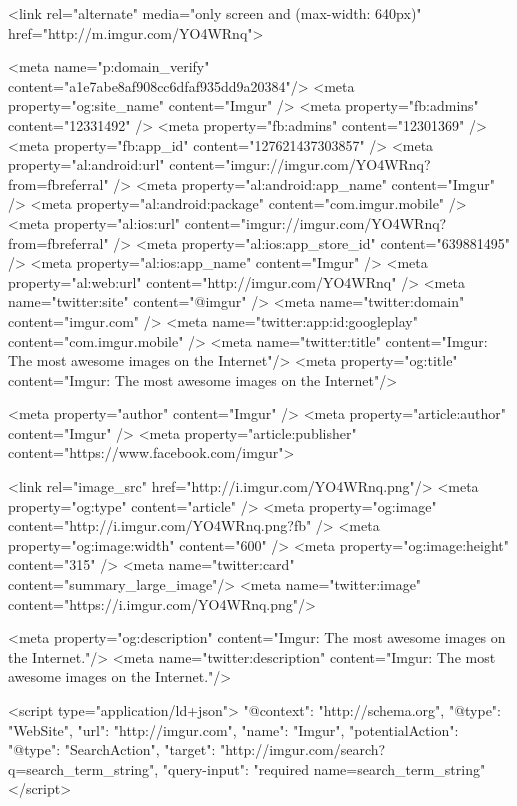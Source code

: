                 <link rel="alternate" media="only screen and (max-width: 640px)" href="http://m.imgur.com/YO4WRnq">
    

    <meta name="p:domain_verify" content="a1e7abe8af908cc6dfaf935dd9a20384"/>
    <meta property="og:site_name" content="Imgur" />
    <meta property="fb:admins" content="12331492" />
    <meta property="fb:admins" content="12301369" />
    <meta property="fb:app_id" content="127621437303857" />
    <meta property="al:android:url" content="imgur://imgur.com/YO4WRnq?from=fbreferral" />
    <meta property="al:android:app_name" content="Imgur" />
    <meta property="al:android:package" content="com.imgur.mobile" />
    <meta property="al:ios:url" content="imgur://imgur.com/YO4WRnq?from=fbreferral" />
    <meta property="al:ios:app_store_id" content="639881495" />
    <meta property="al:ios:app_name" content="Imgur" />
    <meta property="al:web:url" content="http://imgur.com/YO4WRnq" />
    <meta name="twitter:site" content="@imgur" />
    <meta name="twitter:domain" content="imgur.com" />
    <meta name="twitter:app:id:googleplay" content="com.imgur.mobile" />
                <meta name="twitter:title" content="Imgur: The most awesome images on the Internet"/>
        <meta property="og:title" content="Imgur: The most awesome images on the Internet"/>
    

    <meta property="author" content="Imgur" />
    <meta property="article:author" content="Imgur" />
    <meta property="article:publisher" content="https://www.facebook.com/imgur">

    

                        <link rel="image_src"            href="http://i.imgur.com/YO4WRnq.png"/>
            <meta property="og:type"         content="article" />
            <meta property="og:image"        content="http://i.imgur.com/YO4WRnq.png?fb" />
            <meta property="og:image:width"  content="600" />
            <meta property="og:image:height" content="315" />
            <meta name="twitter:card"        content="summary_large_image"/>
            <meta name="twitter:image"       content="https://i.imgur.com/YO4WRnq.png"/>
        
    

            <meta property="og:description" content="Imgur: The most awesome images on the Internet."/>
        <meta name="twitter:description" content="Imgur: The most awesome images on the Internet."/>
    

    
    <script type="application/ld+json">
        {
            "@context": "http://schema.org",
            "@type": "WebSite",
            "url": "http://imgur.com",
            "name": "Imgur",
            "potentialAction": {
                "@type": "SearchAction",
                "target": "http://imgur.com/search?q={search_term_string}",
                "query-input": "required name=search_term_string"
            }
        }
    </script>
    
